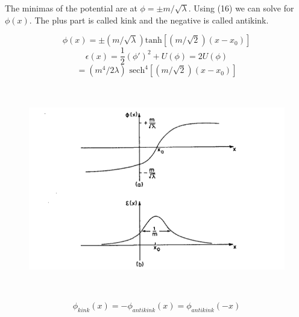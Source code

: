 \documentclass[a4paper, 12pt]{article}
\begin{document}
 The minimas of the potential are at $\phi = \pm m/\sqrt{\lambda}$. Using (16) we can solve for $\phi(x)$. The plus part is called kink and the negative is called antikink.
 
 \begin{equation}%
 \phi (x) = \pm (m/\sqrt{\lambda}) \textrm{tanh}[(m/\sqrt{2})(x - x_0)]
 \end{equation}
 $$ \epsilon (x) = \frac{1}{2}(\phi')^2  + U(\phi) = 2U(\phi) $$
 \begin{equation}%
 =(m^4/2\lambda)\textrm{ sech}^{4 }[(m/\sqrt{2})(x - x_0)]
 \end{equation}
  \begin{figure}[ht]
    \centering
    \includegraphics[height=9cm, width=13cm]{fig2}
\end{figure}
 
 \begin{equation}%
\phi_{kink}(x) = - \phi_{antikink}(x) = \phi_{antikink}(-x)
 \end{equation}
 
\end{document}
